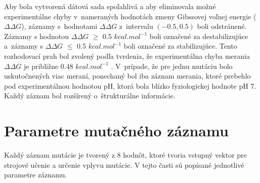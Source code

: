 Aby bola vytvorená dátová sada spoľahlivá a aby eliminovala možné experimentálne chyby v nameraných hodnotách zmeny Gibssovej voľnej energie ($\Delta\Delta G$), záznamy s hodnotami $\Delta\Delta G$ z intervalu $(-0.5,0.5)$ boli odstránené. Záznamy s hodnotou $\Delta\Delta G$ $\geq$ 0.5 $kcal.mol^{-1}$ boli označené za destabilizujúce a záznamy s $\Delta\Delta G$ $\leq$ 0.5 $kcal.mol^{-1}$ boli označené za stabilizujúce. Tento rozhodovací prah bol zvolený podľa tvrdenia, že experimentálna chyba merania $\Delta\Delta G$ je približne 0.48 $kcal.mol^{-1}$ \cite{threshold}.
V prípade, že pre jednu mutáciu bolo uskutočnených viac meraní, ponechaný bol iba záznam merania, ktoré prebehlo pod experimentálnou hodnotou pH, ktorá bola blízko fyziologickej hodnote pH 7. Každý záznam bol rozšírený o štrukturálne informácie.

\section{Parametre mutačného záznamu}

Každý záznam mutácie je tvorený z 8 hodnôt, ktoré tvoria vstupný vektor pre strojové učenie a určenie vplyvu mutácie. V tejto časti sú popísané jednotlivé parametre záznamu.

